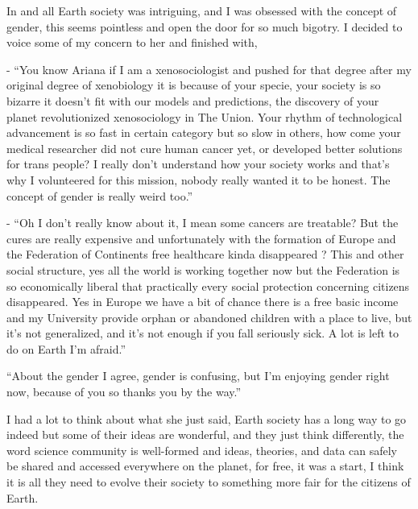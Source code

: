 \documentclass[colorlinks,12pt,a4paper]{book}
\begin{document}
In and all Earth society was intriguing, and I was obsessed with the concept of gender, this seems pointless and 
open the door for so much bigotry. I decided to voice some of my concern to her and finished with,\par
\bigskip

- “You know Ariana if I am a xenosociologist and pushed for that degree after my original degree of xenobiology
 it is because of your specie, your society is so bizarre it doesn't fit with our models and predictions, the discovery 
 of your planet revolutionized xenosociology in The Union. Your rhythm of technological advancement is so fast 
 in certain category but so slow in others, how come your medical researcher did not cure human cancer yet, or 
 developed better solutions for trans people? I really don't understand how your society works and that's why I 
 volunteered for this mission, nobody really wanted it to be honest. The concept of gender is really weird too.”\par
 \bigskip

- “Oh I don't really know about it, I mean some cancers are treatable? But the cures are really expensive and unfortunately 
with the formation of Europe and the Federation of Continents free healthcare kinda disappeared ? This and other social 
structure, yes all the world is working together now but the Federation is so economically liberal that practically 
 every social protection concerning citizens disappeared. Yes in Europe we have a bit of chance there is a free basic
 income and my University provide orphan or abandoned children with a place to live, but it's not generalized, and it's not 
 enough if you fall seriously sick. A lot is left to do on Earth I'm afraid.”\par
 \bigskip

“About the gender I agree, gender is confusing, but I'm enjoying gender right now, because of you so thanks you 
by the way.”\par
\bigskip

I had a lot to think about what she just said, Earth society has a long way to go indeed but some of their 
ideas are wonderful, and they just think differently, the word science community is well-formed and ideas, theories,
 and data can safely be shared and accessed everywhere on the planet, for free, it was a start, I think it is all 
 they need to evolve their society to something more fair for the citizens of Earth.\par
 \bigskip
\end{document}
